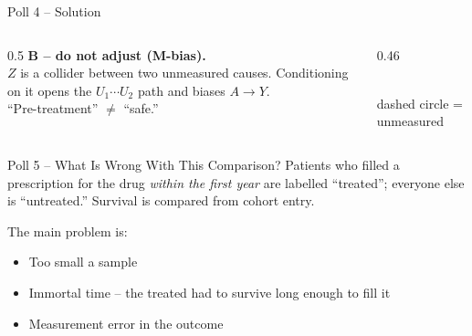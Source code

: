 \documentclass[aspectratio=169]{beamer}
\begin{document}
\begin{frame}{Poll 4 \;--\; Solution}
  \small
  \begin{columns}[T]
    \begin{column}{0.5\textwidth}
      \textcolor{good}{\textbf{B -- do not adjust (M-bias).}}\\[0.4em]
      $Z$ is a collider between two unmeasured causes. Conditioning on it opens
      the $U_1\!\cdots\!U_2$ path and biases $A \to Y$.\\[0.3em]
      \textcolor{brick}{``Pre-treatment'' $\neq$ ``safe.''}
    \end{column}
    \begin{column}{0.46\textwidth}
      \centering
      \\[0.2em]
      {\scriptsize dashed circle = unmeasured}
    \end{column}
  \end{columns}
\end{frame}

\begin{frame}{Poll 5 \;--\; What Is Wrong With This Comparison?}
  \small
  Patients who filled a prescription for the drug \emph{within the first year}
  are labelled ``treated''; everyone else is ``untreated.'' Survival is
  compared from cohort entry.
  \vspace{0.8em}

  The main problem is:
  \begin{itemize}
    \item[\textbf{A.}] Too small a sample
    \item[\textbf{B.}] Immortal time -- the treated had to survive long enough to fill it
    \item[\textbf{C.}] Measurement error in the outcome
  \end{itemize}
\end{frame}
\end{document}
